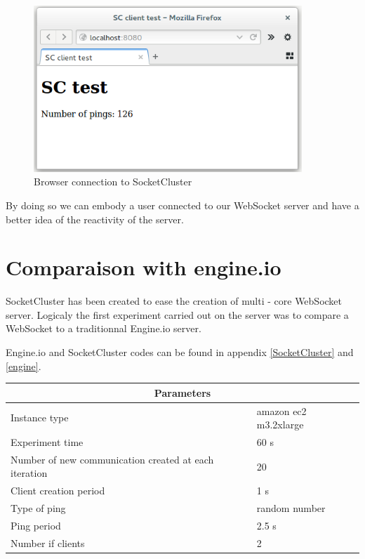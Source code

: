 \begin{figure}[H]
	\centering
		\includegraphics[width=0.9\textwidth]{./Figures/browser.png}
	\caption[browser]{Browser connection to SocketCluster}
	\label{fig:browser}
\end{figure}

By doing so we can embody a user connected to our WebSocket server and have a
better idea of the reactivity of the server.


\section{Comparaison with engine.io}

SocketCluster has been created to ease the creation of multi - core WebSocket
server. Logicaly the first experiment carried out on the server was to compare
a WebSocket to a traditionnal Engine.io server. 

Engine.io and SocketCluster codes can be found in appendix \ref{SocketCluster} and \ref{engine}. 

\begin{center}
  \begin{tabular}{ | l | l |}
  \hline
  \multicolumn{2}{|c|}{Parameters} \\
  \hline
    Instance type &  amazon ec2 m3.2xlarge\\ 
    Experiment time & 60 s \\
    Number of new communication created at each iteration & 20 \\
    Client creation period & 1 s \\
    Type of ping & random number \\ 
    Ping period & 2.5 s \\ 
    Number if clients & 2 \\
  \hline
  \end{tabular}
\end{center}


